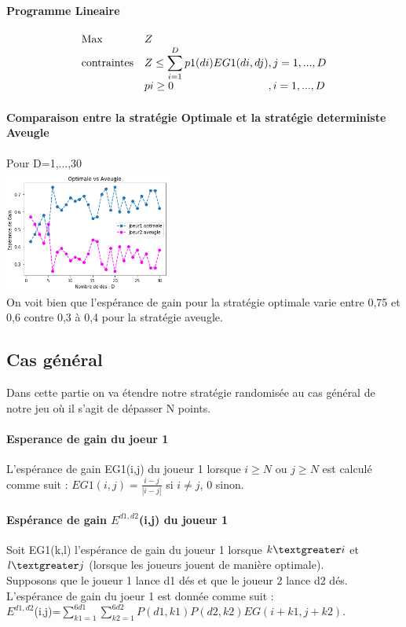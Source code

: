 \documentclass{article}
\begin{document}
{{    \paragraph{Programme Lineaire}
    
    \begin{equation*}
    \begin{array}{ll@{}ll}
    \text{Max}  & \displaystyle Z &\\
    \text{contraintes}& \displaystyle Z\le\sum_{i=1}^{D} {p1(di)EG1(di,dj)}&, j=1 ,..., D\\&pi\ge0 &, i=1 ,..., D
    \end{array}
    \end{equation*}

    \paragraph{Comparaison entre la stratégie Optimale et la stratégie deterministe Aveugle}
    Pour D=1,...,30\\
    \includegraphics[width=15em]{OA.png} \\
    On voit bien que l'espérance de gain pour la stratégie optimale varie entre 0,75 et 0,6 contre 0,3 à 0,4 pour la stratégie aveugle. 

\subsection{Cas général}
\large{
Dans cette partie on va étendre notre stratégie randomisée au cas général de notre jeu où il s'agit de dépasser N points.
\paragraph{Esperance de gain du joeur 1} L'espérance de gain EG1(i,j) du joueur 1 lorsque $i\ge N$ ou $j\ge N$ est calculé comme suit : $EG1(i,j)=\frac{i-j}{|i-j|}$ si $i\neq j$, 0 sinon. 

\paragraph{Espérance de gain $\displaystyle E^{d1,d2}$(i,j) du joueur 1}
Soit EG1(k,l) l'espérance de gain du joueur 1  lorsque $k\textgreater i$ et $l\textgreater j$ (lorsque les joueurs jouent de manière optimale).\\
Supposons que le joueur 1 lance d1 dés et que le joueur 2 lance d2 dés. L'espérance de gain du joeur 1 est donnée comme suit : \\
$\displaystyle E^{d1,d2}$(i,j)=$\sum_{k1=1}^{6d1} \sum_{k2=1}^{6d2}{P(d1,k1)P(d2,k2)EG(i+k1,j+k2)}$.
}}}
\end{document}
